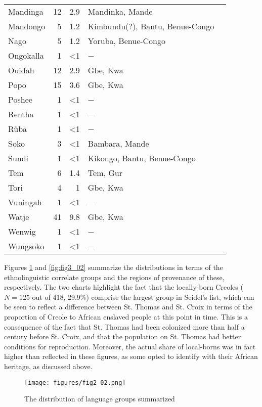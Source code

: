 \documentclass[output=paper,colorlinks,citecolor=brown]{langscibook}
\begin{document}
\begin{longtable}{lrrp{7cm}l}
    Mandinga & 12 & 2.9 & Mandinka, Mande \\
    Mandongo & 5 & 1.2 & Kimbundu(?), Bantu, Benue-Congo \\
    Nago & 5 & 1.2 & Yoruba, Benue-Congo \\
    Ongokalla & 1 & \textless{}1 & − \\
    Ouidah & 12 & 2.9 & Gbe, Kwa \\
    Popo & 15 & 3.6 & Gbe, Kwa \\
    Poshee & 1 & \textless{}1 & − \\
    Rentha & 1 & \textless{}1 & − \\
    Rüba & 1 & \textless{}1 & − \\
    \midrule
    Soko & 3 & \textless{}1 & Bambara, Mande \\
    Sundi & 1 & \textless{}1 & Kikongo, Bantu, Benue-Congo \\
    Tem & 6 & 1.4 & Tem, Gur \\
    Tori & 4 & 1 & Gbe, Kwa \\
    Vuningah & 1 & \textless{}1 & − \\
    Watje & 41 & 9.8 & Gbe, Kwa \\
    Wenwig & 1 & \textless{}1 & − \\
    Wungsoko & 1 & \textless{}1 & − \\
\end{longtable}

Figures \ref{fig:fig2_02} and \ref{fig:fig3_02} summarize the distributions in terms of the ethnolinguistic correlate groups and the regions of provenance of these, respectively. The two charts highlight the fact that the locally-born Creoles ($N=125$ out of 418, 29.9\%) comprise the largest group in Seidel's list, which can be seen to reflect a difference between St. Thomas and St. Croix in terms of the proportion of Creole to African enslaved people at this point in time. This is a consequence of the fact that St. Thomas had been colonized more than half a century before St. Croix, and that the population on St. Thomas had better conditions for reproduction. Moreover, the actual share of local-borns was in fact higher than reflected in these figures, as some opted to identify with their African heritage, as discussed above.

\begin{figure}[!ht]
    \centering
    \texttt{[image: figures/fig2\_02.png]}
    \caption{The distribution of language groups summarized}
    \label{fig:fig2_02}
\end{figure}
\end{document}
